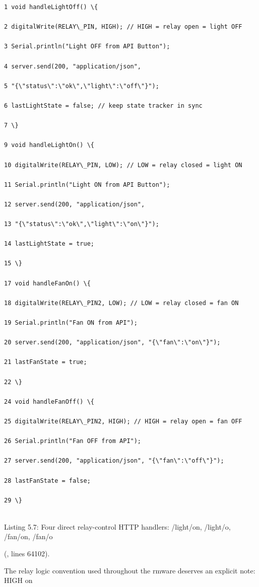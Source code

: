 \begin{listingbox}
	\begin{verbatim}
1 void handleLightOff() \{

2 digitalWrite(RELAY\_PIN, HIGH); // HIGH = relay open = light OFF

3 Serial.println("Light OFF from API Button");

4 server.send(200, "application/json",

5 "{\"status\":\"ok\",\"light\":\"off\"}");

6 lastLightState = false; // keep state tracker in sync

7 \}

9 void handleLightOn() \{

10 digitalWrite(RELAY\_PIN, LOW); // LOW = relay closed = light ON

11 Serial.println("Light ON from API Button");

12 server.send(200, "application/json",

13 "{\"status\":\"ok\",\"light\":\"on\"}");

14 lastLightState = true;

15 \}

17 void handleFanOn() \{

18 digitalWrite(RELAY\_PIN2, LOW); // LOW = relay closed = fan ON

19 Serial.println("Fan ON from API");

20 server.send(200, "application/json", "{\"fan\":\"on\"}");

21 lastFanState = true;

22 \}

24 void handleFanOff() \{

25 digitalWrite(RELAY\_PIN2, HIGH); // HIGH = relay open = fan OFF

26 Serial.println("Fan OFF from API");

27 server.send(200, "application/json", "{\"fan\":\"off\"}");

28 lastFanState = false;

29 \}


\end{verbatim}
\end{listingbox}
Listing 5.7: Four direct relay-control HTTP handlers: /light/on, /light/o, /fan/on, /fan/o

(, lines 64102).

The relay logic convention used throughout the rmware deserves an explicit note: HIGH on

